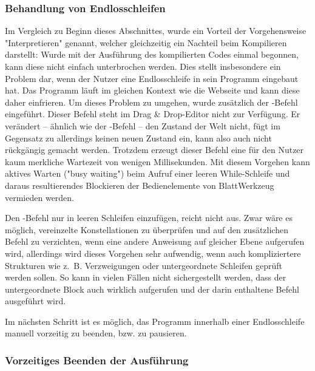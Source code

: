 \subsubsection{Behandlung von Endlosschleifen}

Im Vergleich zu Beginn dieses Abschnittes, wurde ein Vorteil der Vorgehensweise "Interpretieren" genannt, welcher gleichzeitig ein Nachteil beim Kompilieren darstellt: Wurde mit der Ausführung des kompilierten Codes einmal begonnen, kann diese nicht einfach unterbrochen werden. Dies stellt insbesondere ein Problem dar, wenn der Nutzer eine Endlosschleife in sein Programm eingebaut hat. Das Programm läuft im gleichen Kontext wie die Webseite und kann diese daher einfrieren. Um dieses Problem zu umgehen, wurde zusätzlich der -Befehl eingeführt. Dieser Befehl steht im Drag \& Drop-Editor nicht zur Verfügung. Er verändert -- ähnlich wie der -Befehl -- den Zustand der Welt nicht, fügt im Gegensatz zu  allerdings keinen neuen Zustand ein, kann also auch nicht rückgängig gemacht werden. Trotzdem erzeugt dieser Befehl eine für den Nutzer kaum merkliche Wartezeit von wenigen Millisekunden. Mit diesem Vorgehen kann aktives Warten ("busy waiting") beim Aufruf einer leeren While-Schleife und daraus resultierendes Blockieren der Bedienelemente von BlattWerkzeug vermieden werden. 

Den -Befehl nur in leeren Schleifen einzufügen, reicht nicht aus. Zwar wäre es möglich, vereinzelte Konstellationen zu überprüfen und auf den zusätzlichen Befehl zu verzichten, wenn eine andere Anweisung auf gleicher Ebene aufgerufen wird, allerdings wird dieses Vorgehen sehr aufwendig, wenn auch kompliziertere Strukturen wie z.~B. Verzweigungen oder untergeordnete Schleifen geprüft werden sollen. So kann in vielen Fällen nicht sichergestellt werden, dass der untergeordnete Block auch wirklich aufgerufen und der darin enthaltene Befehl ausgeführt wird.

Im nächsten Schritt ist es möglich, das Programm innerhalb einer Endlosschleife manuell vorzeitig zu beenden, bzw. zu pausieren.

\subsubsection{Vorzeitiges Beenden der Ausführung}

